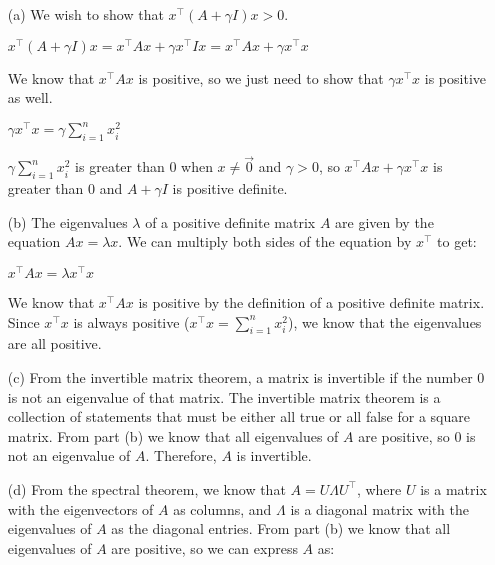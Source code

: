 \documentclass[11pt]{exam}
\theoremstyle{quest}
\begin{document}
\begin{itemize}
\item[(a)]
We wish to show that $ x^{\top}(A + \gamma I)x > 0$.  

$x^{\top}(A + \gamma I)x = x^{\top}A x + \gamma x^{\top} I x = x^{\top}A x + \gamma x^{\top}x$

We know that $ x^{\top}A x$ is positive, so we just need to show that $\gamma x^{\top} x$ is positive as well.

$ \gamma x^{\top}x = \gamma\sum_{i = 1}^n x_{i}^2$

$\gamma\sum_{i = 1}^n x_{i}^2$ is greater than 0 when $x \neq \vec{0}$ and $\gamma > 0$, so $x^{\top}A x + \gamma x^{\top}x$ is greater than 0 and $A+\gamma I$ is positive definite.  

\item[(b)]
The eigenvalues $\lambda$ of a positive definite matrix $A$ are given by the equation $Ax = \lambda x$. We can multiply both sides of the equation by $x^{\top}$ to get:

$x^{\top}A x = \lambda x^{\top} x$

We know that $x^{\top}A x$ is positive by the definition of a positive  definite matrix. Since $x^{\top} x$ is always positive ($x^{\top} x = \sum_{i = 1}^n x_{i}^2$), we know that the eigenvalues are all positive.   

\item[(c)]
From the invertible matrix theorem, a matrix is invertible if the number 0 is not an eigenvalue of that matrix.  The invertible matrix theorem is a collection of statements that must be either all true or all false for a square matrix. From part (b) we know that all eigenvalues of $A$ are positive, so 0 is not an eigenvalue of $A$. Therefore, $A$ is invertible.

\item[(d)]
From the spectral theorem, we know that $A = U\Lambda U^{\top}$, where $U$ is a matrix with the eigenvectors of $A$ as columns, and $\Lambda$ is a diagonal matrix with the eigenvalues of $A$ as the diagonal entries. From part (b) we know that all eigenvalues of $A$ are positive, so we can express $A$ as:


\end{itemize}
\end{document}
